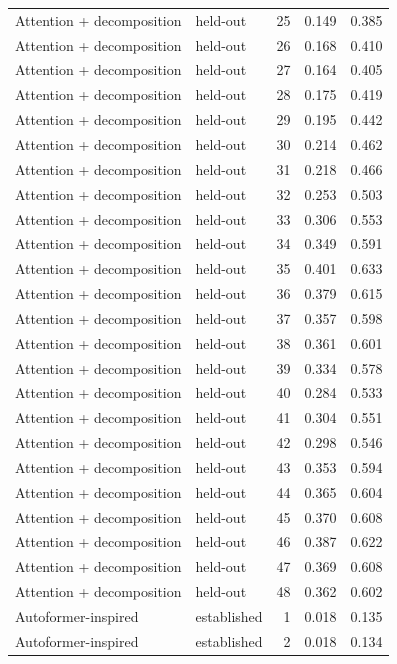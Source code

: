 \begin{tabular}{llrrr}
Attention + decomposition & held-out & 25 & 0.149 & 0.385 \\
Attention + decomposition & held-out & 26 & 0.168 & 0.410 \\
Attention + decomposition & held-out & 27 & 0.164 & 0.405 \\
Attention + decomposition & held-out & 28 & 0.175 & 0.419 \\
Attention + decomposition & held-out & 29 & 0.195 & 0.442 \\
Attention + decomposition & held-out & 30 & 0.214 & 0.462 \\
Attention + decomposition & held-out & 31 & 0.218 & 0.466 \\
Attention + decomposition & held-out & 32 & 0.253 & 0.503 \\
Attention + decomposition & held-out & 33 & 0.306 & 0.553 \\
Attention + decomposition & held-out & 34 & 0.349 & 0.591 \\
Attention + decomposition & held-out & 35 & 0.401 & 0.633 \\
Attention + decomposition & held-out & 36 & 0.379 & 0.615 \\
Attention + decomposition & held-out & 37 & 0.357 & 0.598 \\
Attention + decomposition & held-out & 38 & 0.361 & 0.601 \\
Attention + decomposition & held-out & 39 & 0.334 & 0.578 \\
Attention + decomposition & held-out & 40 & 0.284 & 0.533 \\
Attention + decomposition & held-out & 41 & 0.304 & 0.551 \\
Attention + decomposition & held-out & 42 & 0.298 & 0.546 \\
Attention + decomposition & held-out & 43 & 0.353 & 0.594 \\
Attention + decomposition & held-out & 44 & 0.365 & 0.604 \\
Attention + decomposition & held-out & 45 & 0.370 & 0.608 \\
Attention + decomposition & held-out & 46 & 0.387 & 0.622 \\
Attention + decomposition & held-out & 47 & 0.369 & 0.608 \\
Attention + decomposition & held-out & 48 & 0.362 & 0.602 \\
Autoformer-inspired & established & 1 & 0.018 & 0.135 \\
Autoformer-inspired & established & 2 & 0.018 & 0.134 \\

\end{tabular}
